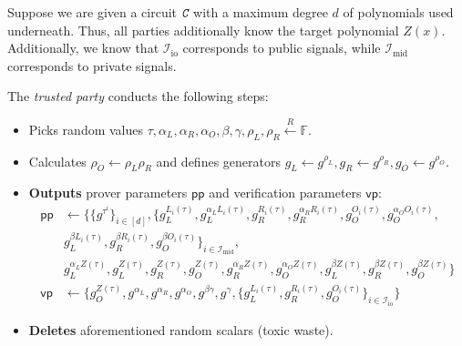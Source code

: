 \documentclass[../lecture-notes.tex]{subfiles}
\begin{document}
\begin{tcolorbox}[title=Pinocchio Protocol,
    colback=blue!5!white,
    colframe=blue!75!black,
    colbacktitle=blue!25!white,
    coltitle=blue!20!black,
    fonttitle=\bfseries,
    boxrule=1.25pt,
    subtitle style={boxrule=0pt,
    colback=blue!20!white,
    colupper=blue!75!gray} ]
    \small
    Suppose we are given a circuit $\textit{\texttt{C}}$ with a maximum degree $d$ of polynomials used underneath. Thus, all parties additionally know the target polynomial $Z(x)$. Additionally, we know that $\mathcal{I}_{\text{io}}$ corresponds to public signals, while $\mathcal{I}_{\text{mid}}$ corresponds to private signals.

    The \emph{trusted party} conducts the following steps:
    \begin{itemize}[label=]
        \item Picks random values $\tau, \alpha_L, \alpha_R, \alpha_O, \beta, \gamma, \rho_L, \rho_R \xleftarrow{R} \mathbb{F}$.
        \item Calculates $\rho_O \gets \rho_L\rho_R$ and defines generators $g_L \gets g^{\rho_L}, g_R \gets g^{\rho_R}, g_O \gets g^{\rho_O}$.
        \item \textbf{Outputs} prover parameters $\mathsf{pp}$ and verification parameters $\mathsf{vp}$:
        \begin{align*}
            \mathsf{pp} &\gets \big\{\{g^{\tau^i}\}_{i \in [d]}, \{g_L^{L_i(\tau)}, g_L^{\alpha_LL_i(\tau)}, g_R^{R_i(\tau)}, g_R^{\alpha_RR_i(\tau)}, g_O^{O_i(\tau)}, g_O^{\alpha_O O_i(\tau)}, \\ 
            & g_L^{\beta L_i(\tau)}, g_R^{\beta R_i(\tau)}, g_O^{\beta O_i(\tau)}\}_{i \in \mathcal{I}_{\text{mid}}}, \\ 
            & g_L^{\alpha_L Z(\tau)}, g_L^{Z(\tau)}, g_R^{Z(\tau)}, g_O^{Z(\tau)}, g_R^{\alpha_R Z(\tau)}, g_O^{\alpha_O Z(\tau)}, g_L^{\beta Z(\tau)}, g_R^{\beta Z(\tau)}, g_O^{\beta Z(\tau)}\big\} \\
            \mathsf{vp} &\gets \big\{ g_O^{Z(\tau)}, g^{\alpha_L}, g^{\alpha_R}, g^{\alpha_O}, g^{\beta\gamma}, g^{\gamma}, \{g_L^{L_i(\tau)}, g_R^{R_i(\tau)}, g_O^{O_i(\tau)}\}_{i \in \mathcal{I}_{\text{io}}} \big\}
        \end{align*}
        \item \textbf{Deletes} aforementioned random scalars (toxic waste).
    \end{itemize}

\end{tcolorbox}
\end{document}
